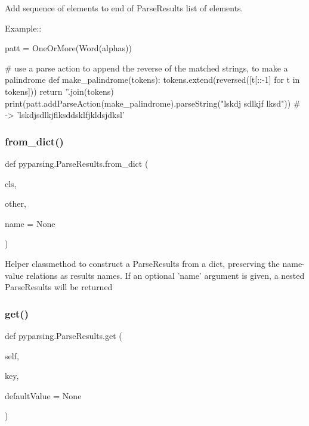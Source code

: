 \begin{DoxyVerb}Add sequence of elements to end of ParseResults list of elements.

Example::

    patt = OneOrMore(Word(alphas))

    # use a parse action to append the reverse of the matched strings, to make a palindrome
    def make_palindrome(tokens):
tokens.extend(reversed([t[::-1] for t in tokens]))
return ''.join(tokens)
    print(patt.addParseAction(make_palindrome).parseString("lskdj sdlkjf lksd")) # -> 'lskdjsdlkjflksddsklfjkldsjdksl'
\end{DoxyVerb}
 \mbox{\label{classpyparsing_1_1ParseResults_a91bfb3141d44ced70928e7ca17bcc5fd}} 
\subsubsection{\texorpdfstring{from\+\_\+dict()}{from\_dict()}}
{\footnotesize\ttfamily def pyparsing.\+Parse\+Results.\+from\+\_\+dict (\begin{DoxyParamCaption}\item[{}]{cls,  }\item[{}]{other,  }\item[{}]{name = {\ttfamily None} }\end{DoxyParamCaption})}

\begin{DoxyVerb}Helper classmethod to construct a ParseResults from a dict, preserving the
name-value relations as results names. If an optional 'name' argument is
given, a nested ParseResults will be returned
\end{DoxyVerb}
 \mbox{\label{classpyparsing_1_1ParseResults_af9642671a6308855bc1fbd4263ce15e0}} 
\subsubsection{\texorpdfstring{get()}{get()}}
{\footnotesize\ttfamily def pyparsing.\+Parse\+Results.\+get (\begin{DoxyParamCaption}\item[{}]{self,  }\item[{}]{key,  }\item[{}]{default\+Value = {\ttfamily None} }\end{DoxyParamCaption})}

